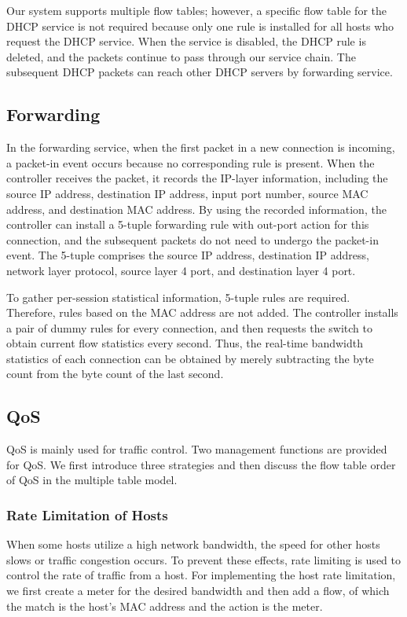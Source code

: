 \documentclass[journal]{IEEEtran}
\begin{document}
Our system supports multiple flow tables; however, a specific flow table for the DHCP service is not required because only one rule is installed for all hosts who request the DHCP service. When the service is disabled, the DHCP rule is deleted, and the packets continue to pass through our service chain. The subsequent DHCP packets can reach other DHCP servers by forwarding service.



\subsection{Forwarding} \label{ssec:forwarding}
In the forwarding service, when the first packet in a new connection is incoming, a packet-in event occurs because no corresponding rule is present. When the controller receives the packet, it records the IP-layer information, including the source IP address, destination IP address, input port number, source MAC address, and destination MAC address. By using the recorded information, the controller can install a 5-tuple forwarding rule with out-port action for this connection, and the subsequent packets do not need to undergo the packet-in event. The 5-tuple comprises the source IP address, destination IP address, network layer protocol, source layer 4 port, and destination layer 4 port.

To gather per-session statistical information, 5-tuple rules are required. Therefore, rules based on the MAC address are not added. The controller installs a pair of dummy rules for every connection, and then requests the switch to obtain current flow statistics every second. Thus, the real-time bandwidth statistics of each connection can be obtained by merely subtracting the byte count from the byte count of the last second.



\subsection{QoS}
QoS is mainly used for traffic control. Two management functions are provided for QoS. We first introduce three strategies and then discuss the flow table order of QoS in the multiple table model.

\subsubsection{Rate Limitation of Hosts}
When some hosts utilize a high network bandwidth, the speed for other hosts slows or traffic congestion occurs. To prevent these effects, rate limiting is used to control the rate of traffic from a host. For implementing the host rate limitation, we first create a meter for the desired bandwidth and then add a flow, of which the match is the host’s MAC address and the action is the meter.
\end{document}
